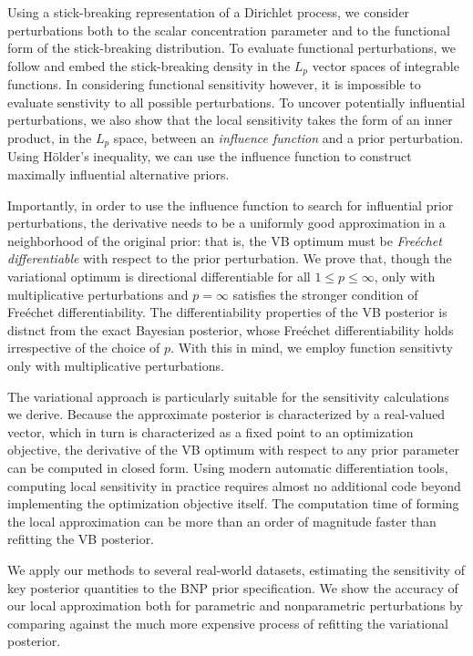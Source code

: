 Using a stick-breaking representation of a Dirichlet process, we
consider perturbations both to the scalar concentration parameter and to the
functional form of the stick-breaking distribution.
To evaluate functional perturbations, we follow \cite{gustafson:1996:local}
and embed the
stick-breaking density in the $L_p$ vector spaces of integrable functions.
In considering functional sensitivity however, it is impossible to
evaluate senstivity to all possible perturbations.
To uncover potentially influential perturbations,
we also show that the local sensitivity takes the form of an inner product,
in the $L_p$ space, between an \textit{influence function}
and a prior perturbation.
Using H{\"o}lder's inequality,
we can use the influence function to construct maximally influential alternative
priors.

Importantly, in order to use the influence function to search for
influential prior perturbations, the derivative needs to be a
uniformly good approximation in
a neighborhood of the original prior: that is, the VB optimum must be
\textit{Fre{\'e}chet differentiable} with respect to the prior perturbation.
We prove that, though the variational optimum is directional differentiable for all
$1 \le p \le \infty$,  only with multiplicative perturbations and
$p=\infty$ satisfies the stronger condition of Fre{\'e}chet differentiability.
The differentiability properties of the VB posterior is distnct from the
exact Bayesian posterior, whose Fre{\'e}chet differentiability
holds irrespective of the choice of $p$.
With this in mind, we employ function sensitivty only with multiplicative
perturbations.

The variational approach is particularly suitable for the
sensitivity calculations we derive.
Because the approximate posterior is characterized by a real-valued vector,
which in turn is characterized as a fixed point to an optimization
objective, the derivative of the VB optimum with respect to any prior
parameter can be computed in closed form.
Using modern automatic differentiation tools, computing local sensitivity
in practice requires almost no additional code beyond
implementing the optimization objective itself.
The computation time of forming the local approximation can be
more than an order of magnitude faster than refitting the VB posterior.

We apply our methods to several real-world datasets, estimating the sensitivity
of key posterior quantities to
the BNP prior specification.
We show the accuracy of our local approximation both for
parametric and nonparametric perturbations by comparing
against the much more expensive process of refitting the variational posterior.

